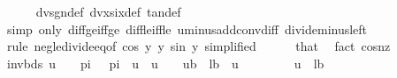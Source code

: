 \begin{isabellebody}
\ \ \ \ \isamarkupfalse%
\ dvsgn{\isacharunderscore}{\kern0pt}def\ dvxsix{\isacharunderscore}{\kern0pt}def\ tan{\isacharunderscore}{\kern0pt}def\isanewline
\ \ \ \ \isamarkupfalse%
\ {\isacharparenleft}{\kern0pt}simp\ only{\isacharcolon}{\kern0pt}\ diff{\isacharunderscore}{\kern0pt}ge{\isacharunderscore}{\kern0pt}{}{\isacharunderscore}{\kern0pt}iff{\isacharunderscore}{\kern0pt}ge\ diff{\isacharunderscore}{\kern0pt}le{\isacharunderscore}{\kern0pt}{}{\isacharunderscore}{\kern0pt}iff{\isacharunderscore}{\kern0pt}le\ uminus{\isacharunderscore}{\kern0pt}add{\isacharunderscore}{\kern0pt}conv{\isacharunderscore}{\kern0pt}diff\ divide{\isacharunderscore}{\kern0pt}minus{\isacharunderscore}{\kern0pt}left{\isacharparenright}{\kern0pt}\isanewline
\ \ \ \ \isamarkupfalse%
\ {\isacharparenleft}{\kern0pt}rule\ neg{\isacharunderscore}{\kern0pt}le{\isacharunderscore}{\kern0pt}divide{\isacharunderscore}{\kern0pt}eq{\isacharbrackleft}{\kern0pt}of\ {\isachardoublequoteopen}cos\ {\isacharparenleft}{\kern0pt}{}{\isacharslash}{\kern0pt}y{\isacharparenright}{\kern0pt}{\isachardoublequoteclose}\ {\isachardoublequoteopen}{}{\isacharslash}{\kern0pt}y{\isachardoublequoteclose}\ {\isachardoublequoteopen}sin\ {\isacharparenleft}{\kern0pt}{}{\isacharslash}{\kern0pt}y{\isacharparenright}{\kern0pt}{\isachardoublequoteclose}{\isacharcomma}{\kern0pt}\ simplified{\isacharbrackright}{\kern0pt}{\isacharparenright}{\kern0pt}\isanewline
\ \ \ \ \isamarkupfalse%
\ that\ \isamarkupfalse%
\ {\isacharparenleft}{\kern0pt}fact\ cosnz{\isacharparenright}{\kern0pt}\isanewline
\isanewline
\ \ \isamarkupfalse%
\ invbds{\isacharcolon}{\kern0pt}\ {\isachardoublequoteopen}u\ {\isacharless}{\kern0pt}\ {}\ {\isacharasterisk}{\kern0pt}\ pi\ {\isacharslash}{\kern0pt}\ {}{\isachardoublequoteclose}\ {\isachardoublequoteopen}pi\ {\isacharless}{\kern0pt}\ u{\isachardoublequoteclose}\ \ {\isachardoublequoteopen}u\ {\isasymin}\ {\isacharbraceleft}{\kern0pt}{}\ {\isacharslash}{\kern0pt}\ ub{\isachardot}{\kern0pt}{\isachardot}{\kern0pt}{}\ {\isacharslash}{\kern0pt}\ lb{\isacharbraceright}{\kern0pt}{\isachardoublequoteclose}\ \ u\isanewline
\ \ \isamarkupfalse%
{\isacharminus}{\kern0pt}\isanewline
\ \ \ \ \isamarkupfalse%
\ {\isachardoublequoteopen}u\ {\isasymle}\ {}{\isacharslash}{\kern0pt}lb{\isachardoublequoteclose}\ \isamarkupfalse%

\end{isabellebody}
